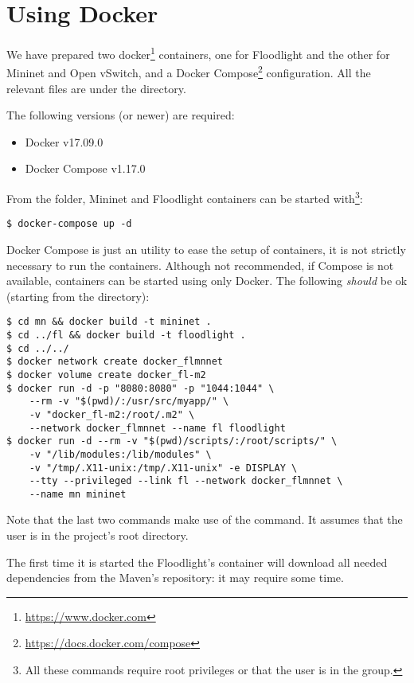 \section{Using Docker}

We have prepared two docker\footnote{\url{https://www.docker.com}} containers,
one for Floodlight and the other for Mininet and Open vSwitch, and a Docker
Compose\footnote{\url{https://docs.docker.com/compose}} configuration. All the
relevant files are under the  directory.

The following versions (or newer) are required:
\begin{itemize}
	\item Docker v17.09.0
	\item Docker Compose v1.17.0
\end{itemize}

From the  folder, Mininet and Floodlight containers can be started
with\footnote{All these commands require root privileges or that the user is in
the  group.}:
\begin{verbatim}
$ docker-compose up -d
\end{verbatim}

Docker Compose is just an utility to ease the setup of containers, it is not
strictly necessary to run the containers. Although not recommended, if Compose
is not available, containers can be started using only Docker. The following
\emph{should} be ok (starting from the  directory):
\begin{verbatim}
$ cd mn && docker build -t mininet .
$ cd ../fl && docker build -t floodlight .
$ cd ../../
$ docker network create docker_flmnnet
$ docker volume create docker_fl-m2
$ docker run -d -p "8080:8080" -p "1044:1044" \
    --rm -v "$(pwd)/:/usr/src/myapp/" \
    -v "docker_fl-m2:/root/.m2" \
    --network docker_flmnnet --name fl floodlight
$ docker run -d --rm -v "$(pwd)/scripts/:/root/scripts/" \
    -v "/lib/modules:/lib/modules" \
    -v "/tmp/.X11-unix:/tmp/.X11-unix" -e DISPLAY \
    --tty --privileged --link fl --network docker_flmnnet \
    --name mn mininet
\end{verbatim}

Note that the last two commands make use of the \code{pwd} command. It assumes
that the user is in the project's root directory.

The first time it is started the Floodlight's container will download all needed
dependencies from the Maven's repository: it may require some time.

